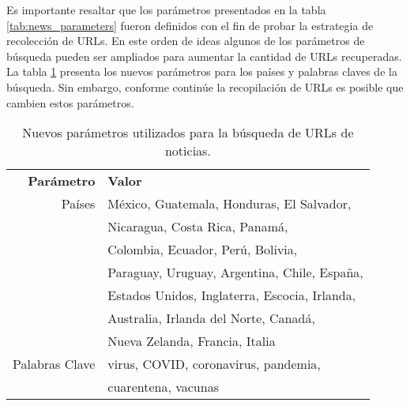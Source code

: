Es importante resaltar que los parámetros presentados en la tabla \ref{tab:news_parameters} fueron definidos con el fin de probar la estrategia de recolección de URLs. En este orden de ideas algunos de los parámetros de búsqueda pueden ser ampliados para aumentar la cantidad de URLs recuperadas. La tabla \ref{tab:news_final_parameters} presenta los nuevos parámetros para los países y palabras claves de la búsqueda. Sin embargo, conforme continúe la recopilación de URLs es posible que cambien estos parámetros.

\begin{table}[h]
    \centering
    \begin{tabular}{r|l}
        \textbf{Parámetro} & \textbf{Valor} \\
        Países  & México, Guatemala, Honduras, El Salvador, \\
                & Nicaragua, Costa Rica, Panamá, \\
                & Colombia, Ecuador, Perú, Bolivia, \\
                & Paraguay, Uruguay, Argentina, Chile, España, \\
                & Estados Unidos, Inglaterra, Escocia, Irlanda, \\
                & Australia, Irlanda del Norte, Canadá, \\
                & Nueva Zelanda, Francia, Italia \\
        Palabras Clave & virus, COVID, coronavirus, pandemia, \\
                & cuarentena, vacunas \\
    \end{tabular}
    \caption{Nuevos parámetros utilizados para la búsqueda de URLs de noticias.}
    \label{tab:news_final_parameters}
\end{table}


